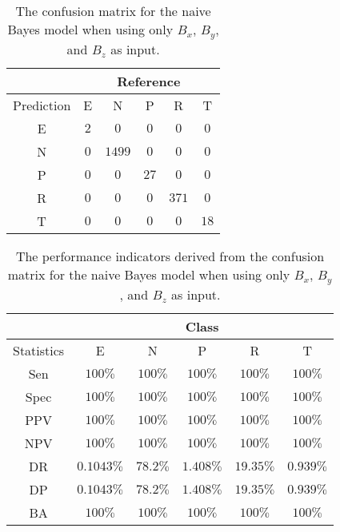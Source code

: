 \begin{table}[!ht]
	\centering
	\begin{tabular}{|c|c|c|c|c|c|}
		\hline
		 & \multicolumn{5}{|c|}{Reference} \\ \hline
		 Prediction & E & N & P & R & T \\ \hline
		 E & $2$ & $0$ & $0$ & $0$ & $0$ \\ \hline
		 N & $0$ & $1499$ & $0$ & $0$ & $0$ \\ \hline
		 P & $0$ & $0$ & $27$ & $0$ & $0$ \\ \hline
		 R & $0$ & $0$ & $0$ & $371$ & $0$ \\ \hline
		 T & $0$ & $0$ & $0$ & $0$ & $18$ \\ \hline
	\end{tabular}
	\caption{The confusion matrix for the naive Bayes model when using only $B_{x}$, $B_{y}$, and $B_{z}$ as input.}
	\label{tab:cm:coord:nb}
\end{table}

\begin{table}[!ht]
	\centering
	\begin{tabular}{|c|c|c|c|c|c|}
		\hline
		 & \multicolumn{5}{c|}{Class} \\ \hline
		Statistics & E & N & P & R & T \\ \hline
		Sen & $100\%$ & $100\%$ & $100\%$ & $100\%$ & $100\%$ \\ \hline
		Spec & $100\%$ & $100\%$ & $100\%$ & $100\%$ & $100\%$ \\ \hline
		PPV & $100\%$ & $100\%$ & $100\%$ & $100\%$ & $100\%$ \\ \hline
		NPV & $100\%$ & $100\%$ & $100\%$ & $100\%$ & $100\%$ \\ \hline
		DR & $0.1043\%$ & $78.2\%$ & $1.408\%$ & $19.35\%$ & $0.939\%$ \\ \hline
		DP & $0.1043\%$ & $78.2\%$ & $1.408\%$ & $19.35\%$ & $0.939\%$ \\ \hline
		BA & $100\%$ & $100\%$ & $100\%$ & $100\%$ & $100\%$ \\ \hline
	\end{tabular}
	\caption{The performance indicators derived from the confusion matrix for the naive Bayes model when using only $B_{x}$, $B_{y}$, and $B_{z}$ as input.}
	\label{tab:cs:reverse:coord:nb}
\end{table}

